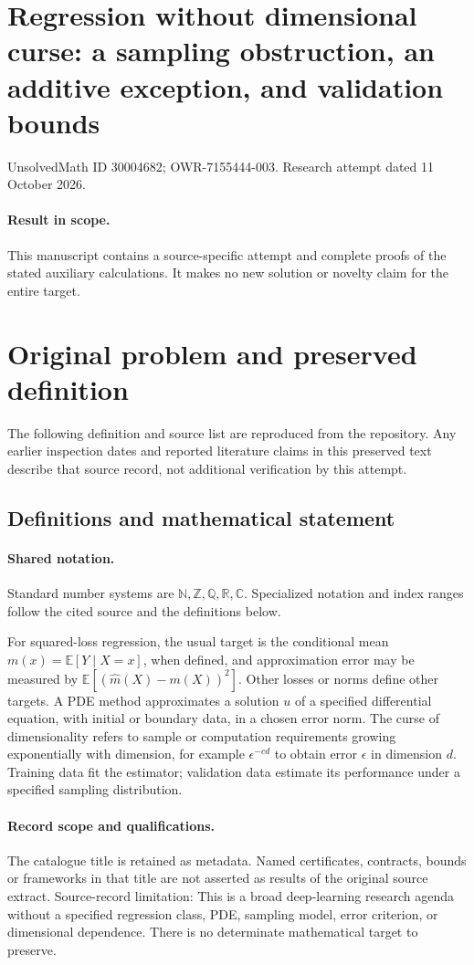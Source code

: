 \documentclass[11pt]{article}
\begin{document}
\section*{Regression without dimensional curse: a sampling obstruction, an additive exception, and validation bounds}
\noindent UnsolvedMath ID 30004682; OWR-7155444-003. Research attempt dated 11 October 2026.
\paragraph{Result in scope.}This manuscript contains a source-specific attempt and complete proofs of the stated auxiliary calculations. It makes no new solution or novelty claim for the entire target.
\section{Original problem and preserved definition}
The following definition and source list are reproduced from the repository. Any earlier inspection dates and reported literature claims in this preserved text describe that source record, not additional verification by this attempt.
\subsection{Definitions and mathematical statement}

\paragraph{Shared notation.}Standard number systems are $\mathbb N,\mathbb Z,\mathbb Q,\mathbb R,\mathbb C$. Specialized notation and index ranges follow the cited source and the definitions below.


For squared-loss regression, the usual target is the conditional mean $m(x)=\mathbb E[Y\mid X=x]$, when defined, and approximation error may be measured by $\mathbb E[(\widehat m(X)-m(X))^2]$. Other losses or norms define other targets. A PDE method approximates a solution $u$ of a specified differential equation, with initial or boundary data, in a chosen error norm. The curse of dimensionality refers to sample or computation requirements growing exponentially with dimension, for example $\epsilon^{-c d}$ to obtain error $\epsilon$ in dimension $d$. Training data fit the estimator; validation data estimate its performance under a specified sampling distribution.
\paragraph{Record scope and qualifications.}
The catalogue title is retained as metadata. Named certificates, contracts, bounds or frameworks in that title are not asserted as results of the original source extract.
Source-record limitation: This is a broad deep-learning research agenda without a specified regression class, PDE, sampling model, error criterion, or dimensional dependence. There is no determinate mathematical target to preserve.
\end{document}
